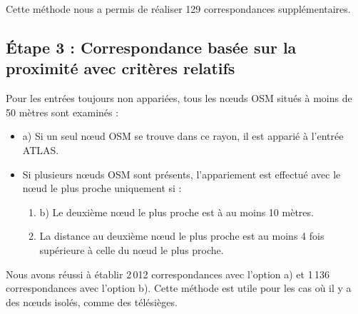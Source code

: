 Cette méthode nous a permis de réaliser 129 correspondances supplémentaires.

\subsection{Étape 3 : Correspondance basée sur la proximité avec critères relatifs}  
Pour les entrées toujours non appariées, tous les nœuds OSM situés à moins de 50 mètres sont examinés :  
\begin{itemize}  
    \item a) Si un seul nœud OSM se trouve dans ce rayon, il est apparié à l’entrée ATLAS.  
    \item Si plusieurs nœuds OSM sont présents, l’appariement est effectué avec le nœud le plus proche uniquement si :  
    \begin{enumerate}  
        \item b) Le deuxième nœud le plus proche est à au moins 10 mètres.  
        \item La distance au deuxième nœud le plus proche est au moins 4 fois supérieure à celle du nœud le plus proche.  
    \end{enumerate}  
\end{itemize}  
Nous avons réussi à établir 2\,012 correspondances avec l'option a) et 1\,136 correspondances avec l'option b).
Cette méthode est utile pour les cas où il y a des nœuds isolés, comme des télésièges.  


